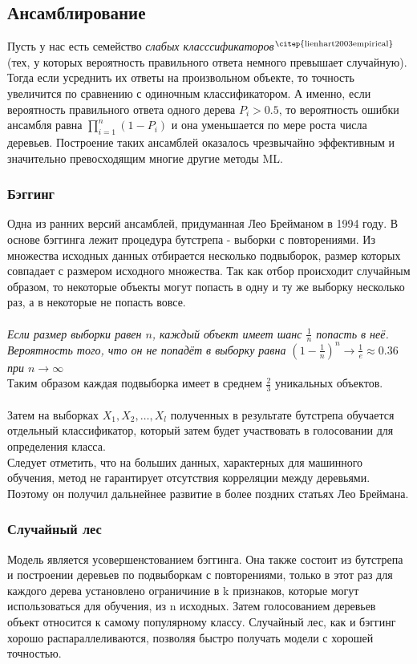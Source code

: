 \documentclass{article}
\begin{document}
    \subsection*{Ансамблирование}  
        Пусть у нас есть семейство \textit{слабых класссификаторов}$^\text{\citep{lienhart2003empirical}}$(тех, у которых вероятность правильного ответа немного превышает случайную). Тогда если усреднить их ответы на произвольном объекте, то точность увеличится по сравнению с одиночным классификатором. А именно, если вероятность правильного ответа одного дерева $P_i > 0.5$, то вероятность ошибки ансамбля равна $\prod\limits_{i = 1}^n (1 - P_i)$ и она уменьшается по мере роста числа деревьев. Построение таких ансамблей оказалось чрезвычайно эффективным и значительно превосходящим многие другие методы ML.
        
        \subsubsection*{Бэггинг \citep{breiman1996bagging}}
            Одна из ранних версий ансамблей, придуманная Лео Брейманом в 1994 году. В основе бэггинга лежит процедура бутстрепа - выборки с повторениями. Из множества исходных данных отбирается несколько подвыборок, размер которых совпадает с размером исходного множества. Так как отбор происходит случайным образом, то некоторые объекты могут попасть в одну и ту же выборку несколько раз, а в некоторые не попасть вовсе. \\ \\
            \textit{Если размер выборки равен $n$, каждый объект имеет шанс $\frac{1}{n}$ попасть в неё. Вероятность того, что он не попадёт в выборку равна $(1 - \frac{1}{n})^n \rightarrow \frac{1}{e} \approx 0.36$ при $n \rightarrow \infty$}  \\
            Таким образом каждая подвыборка имеет в среднем $\frac{2}{3}$ уникальных объектов.
            \\\\
            Затем на выборках $X_1, X_2, \dots, X_l$ полученных в результате бутстрепа обучается отдельный классификатор, который затем будет участвовать в голосовании для определения класса. \\
            Следует отметить, что на больших данных, характерных для машинного обучения, метод не гарантирует отсутствия корреляции между деревьями. Поэтому он получил дальнейнее развитие в более поздних статьях Лео Бреймана.
                
        \subsubsection*{Случайный лес \citep{Random_Forests}} 
            Модель является усовершенстованием бэггинга. Она также состоит из бутстрепа и построении деревьев по подвыборкам с повторениями, только в этот раз для каждого дерева установлено ограничиние в k признаков, которые могут использоваться для обучения, из n исходных. Затем голосованием деревьев объект относится к самому популярному классу. Случайный лес, как и бэггинг хорошо распараллеливаются, позволяя быстро получать модели с хорошей точностью.
        
\end{document}
